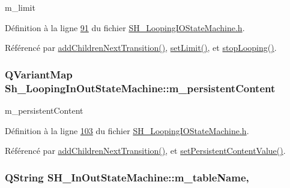 m\-\_\-limit 



Définition à la ligne \hyperlink{SH__LoopingIOStateMachine_8h_source_l00091}{91} du fichier \hyperlink{SH__LoopingIOStateMachine_8h_source}{S\-H\-\_\-\-Looping\-I\-O\-State\-Machine.\-h}.



Référencé par \hyperlink{classSh__LoopingInOutStateMachine_acfd8d0711c793b13c759f6c50be6a315}{add\-Children\-Next\-Transition()}, \hyperlink{classSh__LoopingInOutStateMachine_ab5e9ac94cbd9a47a45dcb50e777c398b}{set\-Limit()}, et \hyperlink{classSh__LoopingInOutStateMachine_a8788fa9e4c3149bcf7554e2a2b960c51}{stop\-Looping()}.

\hypertarget{classSh__LoopingInOutStateMachine_ad9c0db5b057a6ba340ffcaddce60d6da}{
\subsubsection[{m\-\_\-persistent\-Content}]{\setlength{\rightskip}{0pt plus 5cm}Q\-Variant\-Map Sh\-\_\-\-Looping\-In\-Out\-State\-Machine\-::m\-\_\-persistent\-Content\hspace{0.3cm}{\ttfamily [private]}}}\label{classSh__LoopingInOutStateMachine_ad9c0db5b057a6ba340ffcaddce60d6da}


m\-\_\-persistent\-Content 



Définition à la ligne \hyperlink{SH__LoopingIOStateMachine_8h_source_l00103}{103} du fichier \hyperlink{SH__LoopingIOStateMachine_8h_source}{S\-H\-\_\-\-Looping\-I\-O\-State\-Machine.\-h}.



Référencé par \hyperlink{classSh__LoopingInOutStateMachine_acfd8d0711c793b13c759f6c50be6a315}{add\-Children\-Next\-Transition()}, et \hyperlink{classSh__LoopingInOutStateMachine_aa7d8c9cc870607ed9ef75319bff88500}{set\-Persistent\-Content\-Value()}.

\hypertarget{classSH__InOutStateMachine_acc0f5d5133af2dcca30939f53ec8837b}{
\subsubsection[{m\-\_\-table\-Name}]{\setlength{\rightskip}{0pt plus 5cm}Q\-String S\-H\-\_\-\-In\-Out\-State\-Machine\-::m\-\_\-table\-Name\hspace{0.3cm}{\ttfamily [protected]}, {\ttfamily [inherited]}}}\label{classSH__InOutStateMachine_acc0f5d5133af2dcca30939f53ec8837b}


